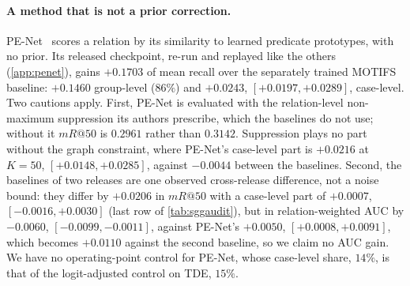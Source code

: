 \paragraph{A method that is not a prior correction.} PE-Net~\cite{zheng2023prototype} scores a
relation by its similarity to learned predicate prototypes, with no prior. Its released
checkpoint, re-run and replayed like the others (\cref{app:penet}), gains $+0.1703$ of mean
recall over the separately trained MOTIFS baseline: $+0.1460$ group-level ($86\%$) and
$+0.0243$, $[+0.0197,+0.0289]$, case-level. Two cautions apply. First, PE-Net is evaluated with
the relation-level non-maximum suppression its authors prescribe, which the baselines do not
use; without it $mR@50$ is $0.2961$ rather than $0.3142$. Suppression plays no part without the
graph constraint, where PE-Net's case-level part is $+0.0216$ at $K=50$, $[+0.0148,+0.0285]$,
against $-0.0044$ between the baselines. Second, the baselines of two releases are one observed
cross-release difference, not a noise bound: they differ by $+0.0206$ in $mR@50$ with a
case-level part of $+0.0007$, $[-0.0016,+0.0030]$ (last row of \cref{tab:sggaudit}), but in
relation-weighted AUC by $-0.0060$, $[-0.0099,-0.0011]$, against PE-Net's $+0.0050$,
$[+0.0008,+0.0091]$, which becomes $+0.0110$ against the second baseline, so we claim no AUC
gain. We have no operating-point control for PE-Net, whose case-level share, $14\%$, is that
of the logit-adjusted control on TDE, $15\%$.

